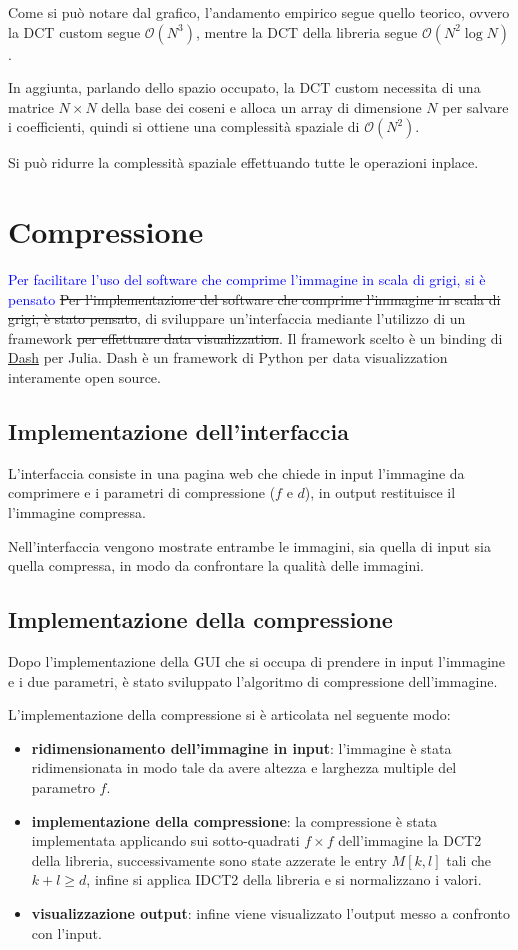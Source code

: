 Come si può notare dal grafico, l'andamento empirico segue quello teorico, ovvero
la DCT custom segue $\mathcal{O}(N^3)$, mentre la DCT della libreria segue $\mathcal{O}(N^2\log N)$.

In aggiunta, parlando dello spazio occupato, la DCT custom necessita di una matrice
$N\times N$ della base dei coseni e alloca un array di dimensione $N$ per salvare
i coefficienti, quindi si ottiene una complessità spaziale di $\mathcal{O}(N^2)$.

Si può ridurre la complessità spaziale effettuando tutte le operazioni inplace.

\section{Compressione}
\textcolor{blue}{Per facilitare l'uso del software che comprime l'immagine in scala di
    grigi, si è pensato}
\st{Per l'implementazione del software che comprime l'immagine in scala di grigi, è stato
    pensato}, di sviluppare un'interfaccia mediante l'utilizzo di un framework \st{per effettuare
    data visualizzation}. Il framework scelto è un binding di \href{https://github.com/plotly/dash}{Dash} per Julia. Dash
è un framework di Python per data visualizzation interamente open source.

\subsection{Implementazione dell'interfaccia}
L'interfaccia consiste in una pagina web che chiede in input l'immagine da comprimere
e i parametri di compressione ($f$ e $d$), in output restituisce il l'immagine compressa.

Nell'interfaccia vengono mostrate entrambe le immagini, sia quella di input sia quella
compressa, in modo da confrontare la qualità delle immagini.

\subsection{Implementazione della compressione}
Dopo l'implementazione della GUI che si occupa di prendere in input l'immagine e
i due parametri, è stato sviluppato l'algoritmo di compressione dell'immagine.

L'implementazione della compressione si è articolata nel seguente modo:
\begin{itemize}
    \item \textbf{ridimensionamento dell'immagine in input}: l'immagine è stata
          ridimensionata in modo tale da avere altezza e larghezza multiple del
          parametro $f$.
    \item \textbf{implementazione della compressione}: la compressione è stata
          implementata applicando sui sotto-quadrati $f\times f$ dell'immagine
          la DCT2 della libreria, successivamente sono state azzerate le entry
          $M[k,l]$ tali che $k+l\ge d$, infine si applica IDCT2 della libreria e
          si normalizzano i valori.
    \item \textbf{visualizzazione output}: infine viene visualizzato l'output
          messo a confronto con l'input.
\end{itemize}


